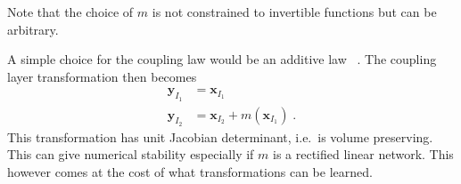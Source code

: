 Note that the choice of $m$ is not constrained to invertible functions but can
be arbitrary.

A simple choice for the coupling law would be an additive law
~\citep{dinhNICENonlinearIndependent2015, gomezReversibleResidualNetwork2017}.
The coupling layer transformation then becomes
\begin{equation}
    \begin{aligned}%
        \label{eq:add_coupling_transform}
        \mathbf{y}_{I_1} &= \mathbf{x}_{I_1} \\
        \mathbf{y}_{I_2} &= \mathbf{x}_{I_2} + m(\mathbf{x}_{I_1})\;.
    \end{aligned}
\end{equation}
This transformation has unit Jacobian determinant, i.e.\ is volume preserving.
This can give numerical stability especially if $m$ is a rectified linear
network. This however comes at the cost of what transformations can be learned.

